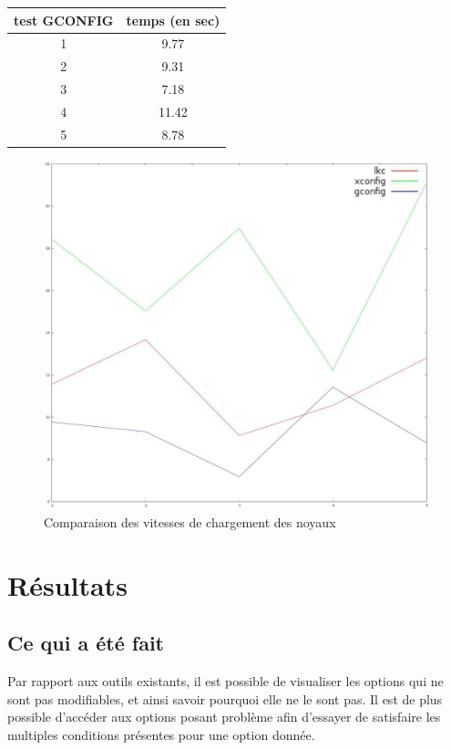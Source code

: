 \documentclass[16pts]{report}
\begin{document}
\begin{tabular}{|c|c|}
\hline
test GCONFIG & temps (en sec) \\
\hline
\hline
1 &  9.77 \\
\hline 
2 & 9.31 \\
\hline
3 & 7.18 \\
\hline
4 & 11.42 \\
\hline
5 & 8.78 \\
\hline
\end{tabular}

\begin{figure}[H]
	\includegraphics[scale=0.5]{./illustrations/speed_cmp.jpeg}
	\centering
	\caption{Comparaison des vitesses de chargement des noyaux}
	\label{fig:VitesseChargement}
\end{figure}


\chapter{Résultats}
\label{cha:Résultats}
    \section{Ce qui a été fait}
    \label{sec:Ce qui a été fait}

    Par rapport aux outils existants, il est possible de visualiser les options
    qui ne sont pas modifiables, et ainsi savoir pourquoi elle ne le sont pas.
    Il est de plus possible d'accéder aux options posant problème afin d'essayer
    de satisfaire les multiples conditions présentes pour une option donnée.
\end{document}
